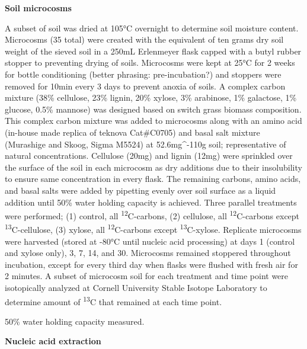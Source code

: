 \textbf{Soil microcosms}

A subset of soil was dried at 105°C overnight to determine soil moisture content. Microcosms (35 total) were created with the equivalent of ten grams dry soil weight of the sieved soil in a 250mL Erlenmeyer flask capped with a butyl rubber stopper to preventing drying of soils.  Microcosms were kept at 25°C for 2 weeks for bottle conditioning (better phrasing: pre-incubation?) and stoppers were removed for 10min every 3 days to prevent anoxia of soils. A complex carbon mixture (38\% cellulose, 23\% lignin, 20\% xylose, 3\% arabinose, 1\% galactose, 1\% glucose, 0.5\% mannose) was designed based on switch grass biomass composition.  This complex carbon mixture was added to microcosms along with an amino acid (in-house made replica of teknova Cat#C0705) and basal salt mixture (Murashige and Skoog, Sigma M5524) at 52.6mg^{-1}10g soil; representative of natural concentrations.  Cellulose (20mg) and lignin (12mg) were sprinkled over the surface of the soil in each microcosm as dry additions due to their insolubility to ensure same concentration in every flask. The remaining carbons, amino acids, and basal salts were added by pipetting evenly over soil surface as a liquid addition until 50\% water holding capacity is achieved.  Three parallel treatments were performed; (1) control, all \textsuperscript{12}C-carbons, (2) cellulose, all \textsuperscript{12}C-carbons except \textsuperscript{13}C-cellulose, (3) xylose, all \textsuperscript{12}C-carbons except \textsuperscript{13}C-xylose.  Replicate microcosms were harvested (stored at -80°C until nucleic acid processing) at days 1 (control and xylose only), 3, 7, 14, and 30.  Microcosms remained stoppered throughout incubation, except for every third day when flasks were flushed with fresh air for 2 minutes.  A subset of microcosm soil for each treatment and time point were isotopically analyzed at Cornell University Stable Isotope Laboratory to determine amount of \textsuperscript{13}C that remained at each time point.                       

50\% water holding capacity measured. 



\textbf{Nucleic acid extraction}


